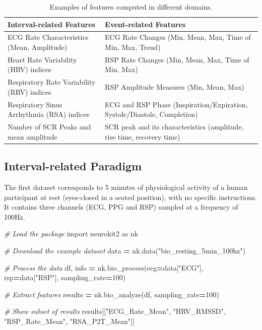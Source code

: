 \documentclass[
  english,
  man,floatsintext]{apa6}
\newenvironment{Shaded}{\begin{snugshade}}{\end{snugshade}}
\newcommand{\CommentTok}[1]{\textcolor[rgb]{0.56,0.35,0.01}{\textit{#1}}}
\newcommand{\DecValTok}[1]{\textcolor[rgb]{0.00,0.00,0.81}{#1}}
\newcommand{\ImportTok}[1]{#1}
\newcommand{\NormalTok}[1]{#1}
\newcommand{\OperatorTok}[1]{\textcolor[rgb]{0.81,0.36,0.00}{\textbf{#1}}}
\newcommand{\StringTok}[1]{\textcolor[rgb]{0.31,0.60,0.02}{#1}}
\begin{document}
\begin{table}[!h]

\caption{\label{tab:table3pdf}Examples of features computed in different domains.}
\centering
\fontsize{9}{11}\selectfont
\begin{tabular}[t]{>{\raggedright\arraybackslash}p{8cm}>{\raggedright\arraybackslash}p{8cm}}
\toprule
Interval-related Features & Event-related Features\\
\midrule
ECG Rate Characteristics (Mean, Amplitude) & ECG Rate Changes (Min, Mean, Max, Time of Min,  Max, Trend)\\
Heart Rate Variability (HRV) indices & RSP Rate Changes (Min, Mean, Max, Time of Min, Max)\\
Respiratory Rate Variability (RRV) indices & RSP Amplitude Measures (Min, Mean, Max)\\
Respiratory Sinus Arrhythmia (RSA) indices & ECG and RSP Phase (Inspiration/Expiration, Systole/Diastole, Completion)\\
Number of SCR Peaks and mean amplitude & SCR peak and its characteristics (amplitude, rise time, recovery time)\\
\bottomrule
\end{tabular}
\end{table}

\hypertarget{interval-related-paradigm}{%
\subsection{Interval-related Paradigm}\label{interval-related-paradigm}}

The first dataset corresponds to 5 minutes of physiological activity of a human participant at rest (eyes-closed in a seated position), with no specific instructions. It contains three channels (ECG, PPG and RSP) sampled at a frequency of 100Hz.

\begin{Shaded}
\begin{Highlighting}[]
\CommentTok{# Load the package}
\ImportTok{import}\NormalTok{ neurokit2 }\ImportTok{as}\NormalTok{ nk}

\CommentTok{# Download the example dataset}
\NormalTok{data }\OperatorTok{=}\NormalTok{ nk.data(}\StringTok{"bio_resting_5min_100hz"}\NormalTok{)}

\CommentTok{# Process the data}
\NormalTok{df, info }\OperatorTok{=}\NormalTok{ nk.bio_process(ecg}\OperatorTok{=}\NormalTok{data[}\StringTok{"ECG"}\NormalTok{],}
\NormalTok{                          rsp}\OperatorTok{=}\NormalTok{data[}\StringTok{"RSP"}\NormalTok{],}
\NormalTok{                          sampling_rate}\OperatorTok{=}\DecValTok{100}\NormalTok{)}

\CommentTok{# Extract features}
\NormalTok{results }\OperatorTok{=}\NormalTok{ nk.bio_analyze(df, sampling_rate}\OperatorTok{=}\DecValTok{100}\NormalTok{)}

\CommentTok{# Show subset of results}
\NormalTok{results[[}\StringTok{"ECG_Rate_Mean"}\NormalTok{, }\StringTok{"HRV_RMSSD"}\NormalTok{, }\StringTok{"RSP_Rate_Mean"}\NormalTok{, }\StringTok{"RSA_P2T_Mean"}\NormalTok{]]}
\end{Highlighting}
\end{Shaded}
\end{document}
